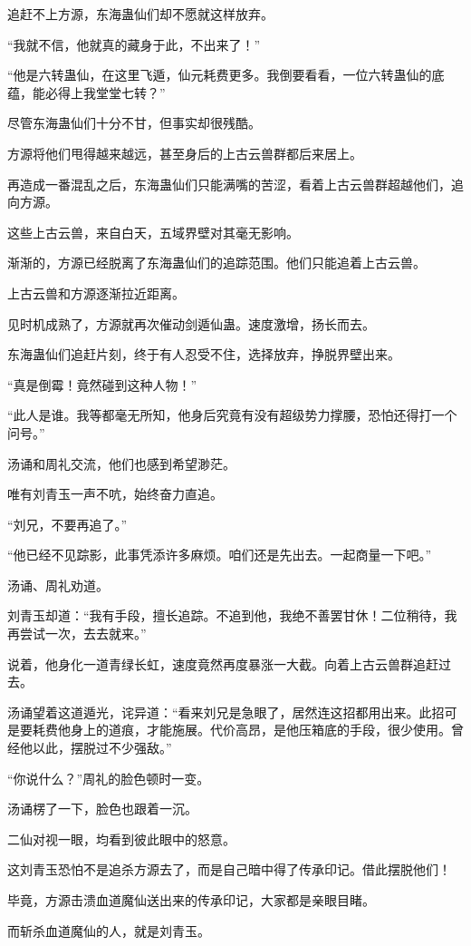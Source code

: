 \begin{this_body}
追赶不上方源，东海蛊仙们却不愿就这样放弃。

“我就不信，他就真的藏身于此，不出来了！”

“他是六转蛊仙，在这里飞遁，仙元耗费更多。我倒要看看，一位六转蛊仙的底蕴，能必得上我堂堂七转？”

尽管东海蛊仙们十分不甘，但事实却很残酷。

方源将他们甩得越来越远，甚至身后的上古云兽群都后来居上。

再造成一番混乱之后，东海蛊仙们只能满嘴的苦涩，看着上古云兽群超越他们，追向方源。

这些上古云兽，来自白天，五域界壁对其毫无影响。

渐渐的，方源已经脱离了东海蛊仙们的追踪范围。他们只能追着上古云兽。

上古云兽和方源逐渐拉近距离。

见时机成熟了，方源就再次催动剑遁仙蛊。速度激增，扬长而去。

东海蛊仙们追赶片刻，终于有人忍受不住，选择放弃，挣脱界壁出来。

“真是倒霉！竟然碰到这种人物！”

“此人是谁。我等都毫无所知，他身后究竟有没有超级势力撑腰，恐怕还得打一个问号。”

汤诵和周礼交流，他们也感到希望渺茫。

唯有刘青玉一声不吭，始终奋力直追。

“刘兄，不要再追了。”

“他已经不见踪影，此事凭添许多麻烦。咱们还是先出去。一起商量一下吧。”

汤诵、周礼劝道。

刘青玉却道：“我有手段，擅长追踪。不追到他，我绝不善罢甘休！二位稍待，我再尝试一次，去去就来。”

说着，他身化一道青绿长虹，速度竟然再度暴涨一大截。向着上古云兽群追赶过去。

汤诵望着这道遁光，诧异道：“看来刘兄是急眼了，居然连这招都用出来。此招可是要耗费他身上的道痕，才能施展。代价高昂，是他压箱底的手段，很少使用。曾经他以此，摆脱过不少强敌。”

“你说什么？”周礼的脸色顿时一变。

汤诵楞了一下，脸色也跟着一沉。

二仙对视一眼，均看到彼此眼中的怒意。

这刘青玉恐怕不是追杀方源去了，而是自己暗中得了传承印记。借此摆脱他们！

毕竟，方源击溃血道魔仙送出来的传承印记，大家都是亲眼目睹。

而斩杀血道魔仙的人，就是刘青玉。


\end{this_body}
